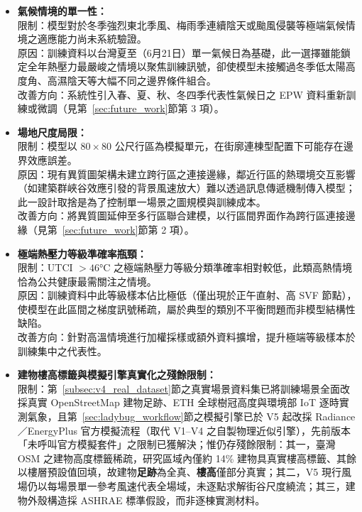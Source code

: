 \begin{itemize}
    \item \textbf{氣候情境的單一性：}\\
    限制：模型對於冬季強烈東北季風、梅雨季連續陰天或颱風侵襲等極端氣候情境之適應能力尚未系統驗證。\\
    原因：訓練資料以台灣夏至（6月21日）單一氣候日為基礎，此一選擇雖能鎖定全年熱壓力最嚴峻之情境以聚焦訓練訊號，卻使模型未接觸過冬季低太陽高度角、高濕陰天等大幅不同之邊界條件組合。\\
    改善方向：系統性引入春、夏、秋、冬四季代表性氣候日之 EPW 資料重新訓練或微調（見第~\ref{sec:future_work}節第 3 項）。
    \item \textbf{場地尺度局限：}\\
    限制：模型以 $80 \times 80$ 公尺行區為模擬單元，在街廓連棟型配置下可能存在邊界效應誤差。\\
    原因：現有異質圖架構未建立跨行區之連接邊緣，鄰近行區的熱環境交互影響（如建築群峽谷效應引發的背景風速放大）難以透過訊息傳遞機制傳入模型；此一設計取捨是為了控制單一場景之圖規模與訓練成本。\\
    改善方向：將異質圖延伸至多行區聯合建模，以行區間界面作為跨行區連接邊緣（見第~\ref{sec:future_work}節第 2 項）。
    \item \textbf{極端熱壓力等級準確率瓶頸：}\\
    限制：UTCI $> 46°\text{C}$ 之極端熱壓力等級分類準確率相對較低，此類高熱情境恰為公共健康最需關注之情境。\\
    原因：訓練資料中此等級樣本佔比極低（僅出現於正午直射、高 SVF 節點），使模型在此區間之梯度訊號稀疏，屬於典型的類別不平衡問題而非模型結構性缺陷。\\
    改善方向：針對高溫情境進行加權採樣或額外資料擴增，提升極端等級樣本於訓練集中之代表性。
    \item \textbf{建物樓高標籤與模擬引擎真實化之殘餘限制：}\\
    限制：第~\ref{subsec:v4_real_dataset}節之真實場景資料集已將訓練場景全面改採真實 OpenStreetMap 建物足跡、ETH 全球樹冠高度與環境部 IoT 逐時實測氣象，且第~\ref{sec:ladybug_workflow}節之模擬引擎已於 V5 起改採 Radiance／EnergyPlus 官方模擬流程（取代 V1--V4 之自製物理近似引擎），先前版本「未呼叫官方模擬套件」之限制已獲解決；惟仍存殘餘限制：其一，臺灣 OSM 之建物高度標籤稀疏，研究區域內僅約 14\% 建物具真實樓高標籤、其餘以樓層預設值回填，故建物\textbf{足跡}為全真、\textbf{樓高}僅部分真實；其二，V5 現行風場仍以每場景單一參考風速代表全場域，未逐點求解街谷尺度繞流；其三，建物外殼構造採 ASHRAE 標準假設，而非逐棟實測材料。\\

\end{itemize}
